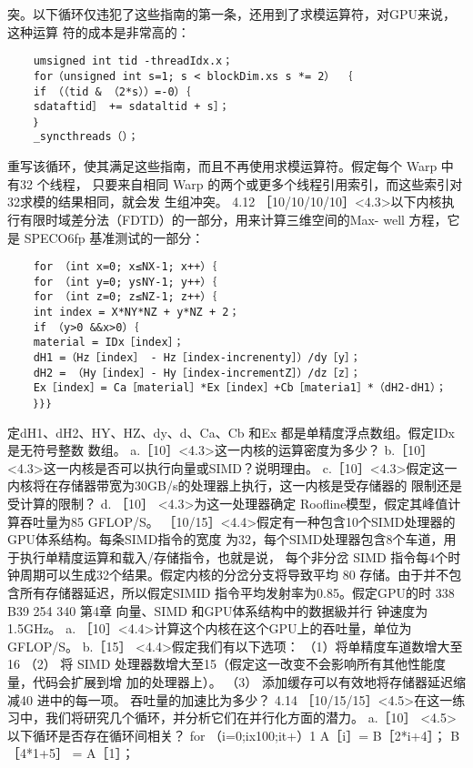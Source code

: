 突。以下循环仅违犯了这些指南的第一条，还用到了求模运算符，对GPU来说，这种运算
符的成本是非常高的：
\begin{verbatim}
    umsigned int tid -threadIdx.x；
    for（unsigned int s=1; s < blockDim.xs s *= 2） ｛
    if （（tid & （2*s））=-0）｛
    sdataftid］ += sdataltid + s］；
    ｝
    _syncthreads（）；
\end{verbatim}
重写该循环，使其满足这些指南，而且不再使用求模运算符。假定每个 Warp 中有32 个线程，
只要来自相同 Warp 的两个或更多个线程引用索引，而这些索引对32求模的结果相同，就会发
生组冲突。
4.12 ［10/10/10/10］<4.3>以下内核执行有限时域差分法（FDTD）的一部分，用来计算三维空间的Max-
well 方程，它是 SPECO6fp 基准测试的一部分：
\begin{verbatim}
    for （int x=0; x≤NX-1; x++）｛
    for （int y=0; ysNY-1; y++）｛
    for （int z=0; z≤NZ-1; z++）｛
    int index = X*NY*NZ + y*NZ + 2；
    if （y>0 &&x>0）｛
    material = IDx［index］；
    dH1 =（Hz［index］ - Hz［index-increnenty］）/dy［y］；
    dH2 = （Hy［index］- Hy［index-incrementZ］）/dz［z］；
    Ex［index］= Ca［material］*Ex［index］+Cb［materia1］*（dH2-dH1）；
    ｝｝｝
\end{verbatim}
定dH1、dH2、HY、HZ、dy、d、Ca、Cb 和Ex 都是单精度浮点数组。假定IDx是无符号整数
数组。
a.［10］<4.3>这一内核的运算密度为多少？
b.［10］<4.3>这一内核是否可以执行向量或SIMD？说明理由。
c.［10］<4.3>假定这一内核将在存储器带宽为30GB/s的处理器上执行，这一内核是受存储器的
限制还是受计算的限制？
d. ［10］ <4.3>为这一处理器确定 Roofline模型，假定其峰值计算吞吐量为85 GFLOP/S。
［10/15］<4.4>假定有一种包含10个SIMD处理器的GPU体系结构。每条SIMD指令的宽度
为32，每个SIMD处理器包含8个车道，用于执行单精度运算和载入/存储指令，也就是说，
每个非分岔 SIMD 指令每4个时钟周期可以生成32个结果。假定内核的分岔分支将导致平均
80%
存储。由于并不包含所有存储器延迟，所以假定SIMID 指令平均发射率为0.85。假定GPU的时
338
B39
254
340
第4章
向量、SIMD 和GPU体系结构中的数据級并行
钟速度为1.5GHz。
a. ［10］<4.4>计算这个内核在这个GPU上的吞吐量，单位为GFLOP/S。
b.［15］ <4.4>假定我们有以下选项：
（1）将单精度车道数增大至16
（2） 将 SIMD 处理器数增大至15（假定这一改变不会影响所有其他性能度量，代码会扩展到增
加的处理器上）。
（3） 添加缓存可以有效地将存储器延迟缩减40%
进中的每一项。
吞吐量的加速比为多少？
4.14 ［10/15/15］<4.5>在这一练习中，我们将研究几个循环，并分析它们在并行化方面的潜力。
a.［10］ <4.5>以下循环是否存在循环间相关？
for （i=0;ix100;it+）1
A［i］= B［2*i+4］；
B［4*1+5］ = A［1］；
